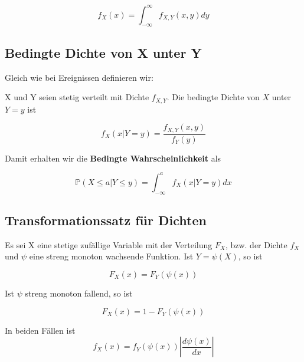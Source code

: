 {    \[
    f_{X}\left(x\right)=\int_{-{\infty}}^{{\infty}}{f_{X,Y}\left(x,y\right)}dy
    \]
    \subsection{Bedingte Dichte von X unter Y}

    \begin{definition}
        Gleich wie bei Ereignissen definieren wir:

        X und Y seien stetig verteilt mit Dichte $f_{X,Y}$.
        Die bedingte Dichte von $X$ unter $Y=y$ ist

        \[
            f_{X}\left(x|Y=y\right)=\frac{f_{X,Y}(x,y)}{f_{Y}(y)}
        \]
    \end{definition}

    Damit erhalten wir die \textbf{Bedingte Wahrscheinlichkeit} als

    \[
    \mathbb P\left(X\le a|Y\le y\right)=\int_{-{\infty}}^{a}{f_{X}\left(x|Y=y\right)}dx
    \]
    
    \bigskip

    \subsection{Transformationssatz für Dichten}
    \label{sec:transformationssatz_dichten}
    \begin{definition}
    Es sei X eine stetige zufällige Variable mit der Verteilung $F_{X}$, {bzw. der Dichte} $f_{X}$
    und $\psi$ eine streng monoton wachsende Funktion. Ist $Y=\psi\left(X\right)$, so ist

    \[
    F_{X}\left(x\right)=F_{Y}\left(\psi \left(x\right)\right)
    \]

    Ist $\psi$ streng monoton fallend, so ist

    \[
    F_{X}\left(x\right)=1-F_{Y}\left(\psi \left(x\right)\right)
    \]

    In beiden Fällen ist
    \[
    f_{X}\left(x\right)=f_{Y}\left(\psi \left(x\right)\right)\left|\frac{d\psi (x)}{dx}\right|
    \]

    \label{satz:verteilung_x_y}

    \end{definition}


}
